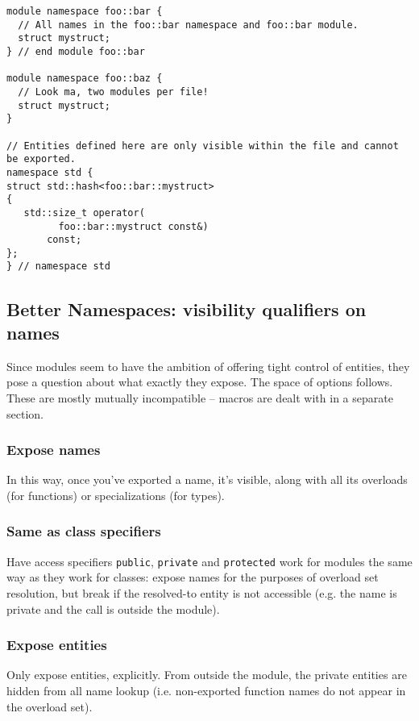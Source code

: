 \documentclass[reqno]{article}
\begin{document}
\begin{verbatim}
module namespace foo::bar {
  // All names in the foo::bar namespace and foo::bar module.
  struct mystruct;
} // end module foo::bar

module namespace foo::baz {
  // Look ma, two modules per file!
  struct mystruct;
}

// Entities defined here are only visible within the file and cannot be exported.
namespace std {
struct std::hash<foo::bar::mystruct>
{
   std::size_t operator(
         foo::bar::mystruct const&)
       const;
};
} // namespace std
\end{verbatim}


\subsection{Better Namespaces: visibility qualifiers on names}

Since modules seem to have the ambition of offering tight control of entities,
they pose a question about what exactly they expose. The space of options
follows. These are mostly mutually incompatible -- macros are dealt with in a
separate section.


\subsubsection{Expose names}

In this way, once you've exported a name, it's visible, along with all its
overloads (for functions) or specializations (for types).


\subsubsection{Same as class specifiers}

Have access specifiers \texttt{public}, \texttt{private} and \texttt{protected}
work for modules the same way as they work for classes: expose names for the
purposes of overload set resolution, but break if the resolved-to entity is
not accessible (e.g. the name is private and the call is outside the module).


\subsubsection{Expose entities}

Only expose entities, explicitly. From outside the module, the private entities
are hidden from all name lookup (i.e. non-exported function names do not appear
in the overload set).
\end{document}
